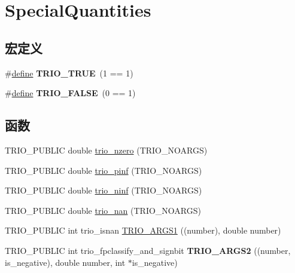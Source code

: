 \hypertarget{group___special_quantities}{}\section{Special\+Quantities}
\label{group___special_quantities}
\subsection*{宏定义}
\begin{DoxyCompactItemize}
\item 
\mbox{\label{group___special_quantities_ga798664928488de3a429b75377fb665b0}} 
\#\hyperlink{structdefine}{define} {\bfseries T\+R\+I\+O\+\_\+\+T\+R\+UE}~(1 == 1)
\item 
\mbox{\label{group___special_quantities_gaca3f677d738972b97ed1c430abff30b2}} 
\#\hyperlink{structdefine}{define} {\bfseries T\+R\+I\+O\+\_\+\+F\+A\+L\+SE}~(0 == 1)
\end{DoxyCompactItemize}
\subsection*{函数}
\begin{DoxyCompactItemize}
\item 
T\+R\+I\+O\+\_\+\+P\+U\+B\+L\+IC double \hyperlink{group___special_quantities_ga2297b57060a605b6b0809a04a8d074c7}{trio\+\_\+nzero} (T\+R\+I\+O\+\_\+\+N\+O\+A\+R\+GS)
\item 
T\+R\+I\+O\+\_\+\+P\+U\+B\+L\+IC double \hyperlink{group___special_quantities_ga32a239c5ff735f34ec4d813e0b7c59f7}{trio\+\_\+pinf} (T\+R\+I\+O\+\_\+\+N\+O\+A\+R\+GS)
\item 
T\+R\+I\+O\+\_\+\+P\+U\+B\+L\+IC double \hyperlink{group___special_quantities_ga59b7b052ec7461d44e05e5aaf36197f4}{trio\+\_\+ninf} (T\+R\+I\+O\+\_\+\+N\+O\+A\+R\+GS)
\item 
T\+R\+I\+O\+\_\+\+P\+U\+B\+L\+IC double \hyperlink{group___special_quantities_gaccfad5a91a03898bf5e68f3d4040818e}{trio\+\_\+nan} (T\+R\+I\+O\+\_\+\+N\+O\+A\+R\+GS)
\item 
T\+R\+I\+O\+\_\+\+P\+U\+B\+L\+IC int trio\+\_\+isnan \hyperlink{group___special_quantities_ga820bb31d0a8e0106adeeb1b6b8857019}{T\+R\+I\+O\+\_\+\+A\+R\+G\+S1} ((number), double number)
\item 
\mbox{\label{group___special_quantities_ga9b3bbf3a298853235a0fc7f53911e156}} 
T\+R\+I\+O\+\_\+\+P\+U\+B\+L\+IC int trio\+\_\+fpclassify\+\_\+and\+\_\+signbit {\bfseries T\+R\+I\+O\+\_\+\+A\+R\+G\+S2} ((number, is\+\_\+negative), double number, int $\ast$is\+\_\+negative)
\end{DoxyCompactItemize}


